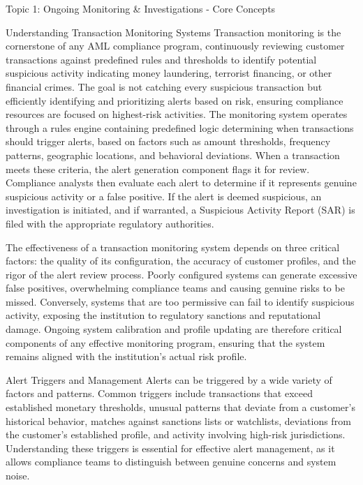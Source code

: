 \documentclass[5pt]{beamer}
\begin{document}
	\begin{frame}{Topic 1: Ongoing Monitoring \& Investigations - Core Concepts}
		\begin{block}{\tiny Understanding Transaction Monitoring Systems}
			\tiny Transaction monitoring is the cornerstone of any AML compliance program, continuously reviewing customer transactions against predefined rules and thresholds to identify potential suspicious activity indicating money laundering, terrorist financing, or other financial crimes. The goal is not catching every suspicious transaction but efficiently identifying and prioritizing alerts based on risk, ensuring compliance resources are focused on highest-risk activities. The monitoring system operates through a rules engine containing predefined logic determining when transactions should trigger alerts, based on factors such as amount thresholds, frequency patterns, geographic locations, and behavioral deviations. When a transaction meets these criteria, the alert generation component flags it for review. Compliance analysts then evaluate each alert to determine if it represents genuine suspicious activity or a false positive. If the alert is deemed suspicious, an investigation is initiated, and if warranted, a Suspicious Activity Report (SAR) is filed with the appropriate regulatory authorities.
			
			The effectiveness of a transaction monitoring system depends on three critical factors: the quality of its configuration, the accuracy of customer profiles, and the rigor of the alert review process. Poorly configured systems can generate excessive false positives, overwhelming compliance teams and causing genuine risks to be missed. Conversely, systems that are too permissive can fail to identify suspicious activity, exposing the institution to regulatory sanctions and reputational damage. Ongoing system calibration and profile updating are therefore critical components of any effective monitoring program, ensuring that the system remains aligned with the institution's actual risk profile.
		\end{block}
		
		\begin{block}{\tiny Alert Triggers and Management}
			\tiny Alerts can be triggered by a wide variety of factors and patterns. Common triggers include transactions that exceed established monetary thresholds, unusual patterns that deviate from a customer's historical behavior, matches against sanctions lists or watchlists, deviations from the customer's established profile, and activity involving high-risk jurisdictions. Understanding these triggers is essential for effective alert management, as it allows compliance teams to distinguish between genuine concerns and system noise.
			

\end{block}
\end{frame}
\end{document}
